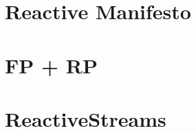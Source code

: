 \documentclass[../main.tex]{subfiles}
\begin{document}
\section{Reactive Manifesto}
\section{FP + RP}
\section{ReactiveStreams}
\end{document}
